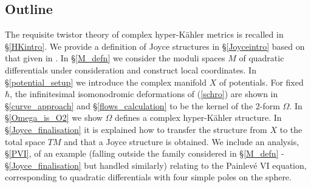 \documentclass[a4paper,12pt,reqno]{amsart}
\numberwithin{equation}{section}
\numberwithin{counter2}{section}
\begin{document}
\subsection*{Outline} 
The requisite twistor theory of complex hyper-K\"ahler metrics is recalled in \S \ref{HKintro}.  We provide a definition of Joyce structures in \S \ref{Joyceintro} based on that given in \cite{BS}.  In \S \ref{M_defn} we consider the moduli spaces $M$ of quadratic differentials under consideration and construct local coordinates.  In \S \ref{potential_setup} we introduce the complex manifold $X$ of potentials.  For fixed $\hbar$,  the infinitesimal isomonodromic deformations of (\ref{schro}) are shown in \S \ref{curve_approach} and \S \ref{flows_calculation} to be the kernel of the $2$-form $\Omega$.  In \S \ref{Omega_is_O2} we show $\Omega$ defines a complex hyper-K\"ahler structure.  In \S \ref{Joyce_finalisation} it is explained how to transfer the structure from $X$ to the total space $TM$ and that a Joyce structure is obtained.  We include an analysis,  \S \ref{PVI},  of an example (falling outside the family considered in \S \ref{M_defn} - \S \ref{Joyce_finalisation} but handled similarly) relating to the Painlev\'e VI equation,  corresponding to quadratic differentials with four simple poles on the sphere.  
\end{document}
